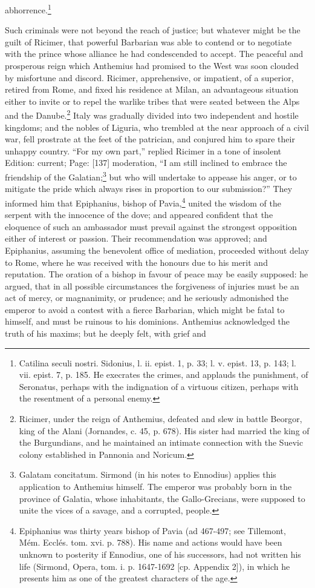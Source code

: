 abhorrence.\footnote{Catilina seculi nostri. Sidonius, l. ii. epist. 1, p. 33; l. v. epist. 13, p. 143; l. vii. epist. 7, p. 185. He execrates the crimes, and applauds the punishment, of Seronatus, perhaps with the indignation of a virtuous citizen, perhaps with the resentment of a personal enemy.}

Such criminals were not beyond the reach of justice; but whatever might be the guilt of Ricimer, that powerful Barbarian was able to contend or to negotiate with the prince whose alliance he had condescended to accept. The peaceful and prosperous reign which Anthemius had promised to the West was soon clouded by misfortune and discord. Ricimer, apprehensive, or impatient, of a superior, retired from Rome, and fixed his residence at Milan, an advantageous situation either to invite or to repel the warlike tribes that were seated between the Alps and the Danube.\footnote{Ricimer, under the reign of Anthemius, defeated and slew in battle Beorgor, king of the Alani (Jornandes, c. 45, p. 678). His sister had married the king of the Burgundians, and he maintained an intimate connection with the Suevic colony established in Pannonia and Noricum.} Italy was gradually divided into two independent and hostile kingdoms; and the nobles of Liguria, who trembled at the near approach of a civil war, fell prostrate at the feet of the patrician, and conjured him to spare their unhappy country. \texthebrew{“}For my own part,\texthebrew{}” replied Ricimer in a tone of insolent Edition: current; Page: [137] moderation, \texthebrew{“}I am still inclined to embrace the friendship of the Galatian;\footnote{Galatam concitatum. Sirmond (in his notes to Ennodius) applies this application to Anthemius himself. The emperor was probably born in the province of Galatia, whose inhabitants, the Gallo-Grecians, were supposed to unite the vices of a savage, and a corrupted, people.} but who will undertake to appease his anger, or to mitigate the pride which always rises in proportion to our submission?\texthebrew{}” They informed him that Epiphanius, bishop of Pavia,\footnote{Epiphanius was thirty years bishop of Pavia (ad 467-497; see Tillemont, Mém. Ecclés. tom. xvi. p. 788). His name and actions would have been unknown to posterity if Ennodius, one of his successors, had not written his life (Sirmond, Opera, tom. i. p. 1647-1692 [cp. Appendix 2]), in which he presents him as one of the greatest characters of the age.} united the wisdom of the serpent with the innocence of the dove; and appeared confident that the eloquence of such an ambassador must prevail against the strongest opposition either of interest or passion. Their recommendation was approved; and Epiphanius, assuming the benevolent office of mediation, proceeded without delay to Rome, where he was received with the honours due to his merit and reputation. The oration of a bishop in favour of peace may be easily supposed: he argued, that in all possible circumstances the forgiveness of injuries must be an act of mercy, or magnanimity, or prudence; and he seriously admonished the emperor to avoid a contest with a fierce Barbarian, which might be fatal to himself, and must be ruinous to his dominions. Anthemius acknowledged the truth of his maxims; but he deeply felt, with grief and 